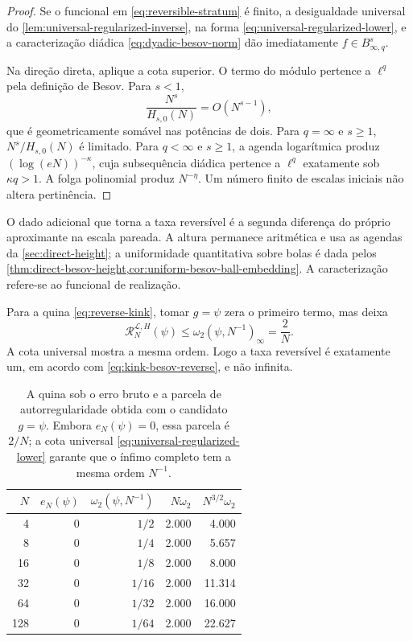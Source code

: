 \documentclass[11pt,a4paper]{article}
\theoremstyle{definition}
\theoremstyle{remark}
\newcommand{\Library}{\mathcal{L}}
\begin{document}
\begin{proof}
Se o funcional em \eqref{eq:reversible-stratum} é finito, a desigualdade
universal do \cref{lem:universal-regularized-inverse}, na forma
\eqref{eq:universal-regularized-lower}, e a caracterização diádica
\eqref{eq:dyadic-besov-norm} dão imediatamente
$f\in B^s_{\infty,q}$.

Na direção direta, aplique a cota superior. O termo do módulo pertence a
$\ell^q$ pela definição de Besov. Para $s<1$,
\[
 \frac{N^s}{H_{s,0}(N)}=O(N^{s-1}),
\]
que é geometricamente somável nas potências de dois. Para $q=\infty$ e
$s\ge1$, $N^s/H_{s,0}(N)$ é limitado. Para $q<\infty$ e $s\ge1$, a agenda
logarítmica produz $(\log(eN))^{-\kappa}$, cuja subsequência diádica pertence
a $\ell^q$ exatamente sob $\kappa q>1$. A folga polinomial produz
$N^{-\eta}$. Um número finito de escalas iniciais não altera pertinência.
\end{proof}

O dado adicional que torna a taxa reversível é a segunda diferença do próprio
aproximante na escala pareada. A altura permanece aritmética e usa as agendas
da \cref{sec:direct-height}; a uniformidade quantitativa sobre bolas é dada
pelos \cref{thm:direct-besov-height,cor:uniform-besov-ball-embedding}. A caracterização refere-se ao funcional de realização.

Para a quina \eqref{eq:reverse-kink}, tomar $g=\psi$ zera o primeiro termo,
mas deixa
\begin{equation}
 \mathcal R_N^{\Library,H}(\psi)
 \le\omega_2(\psi,N^{-1})_\infty=\frac2N.
 \label{eq:kink-regularized-rate}
\end{equation}
A cota universal mostra a mesma ordem. Logo a taxa reversível é exatamente
um, em acordo com \eqref{eq:kink-besov-reverse}, e não infinita.

\begin{table}[t]
 \centering
 \small
 \begin{tabular}{rrrrr}
\toprule
$N$ & $e_N(\psi)$ & $\omega_2(\psi,N^{-1})$ & $N\omega_2$ & $N^{3/2}\omega_2$\\
\midrule
4 & 0 & $1/2$ & 2.000 & 4.000\\
8 & 0 & $1/4$ & 2.000 & 5.657\\
16 & 0 & $1/8$ & 2.000 & 8.000\\
32 & 0 & $1/16$ & 2.000 & 11.314\\
64 & 0 & $1/32$ & 2.000 & 16.000\\
128 & 0 & $1/64$ & 2.000 & 22.627\\
\bottomrule
\end{tabular}

 \caption{A quina sob o erro bruto e a parcela de autorregularidade obtida
 com o candidato $g=\psi$. Embora $e_N(\psi)=0$, essa parcela é $2/N$; a
 cota universal \eqref{eq:universal-regularized-lower} garante que o ínfimo
 completo tem a mesma ordem $N^{-1}$.}
 \label{tab:kink-regularized-certificate}
\end{table}
\end{document}
